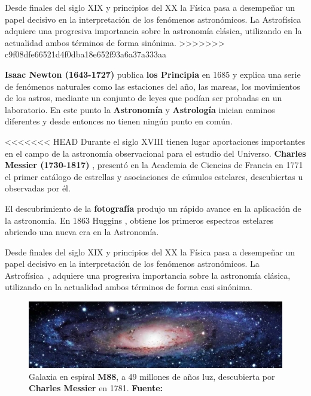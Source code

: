 \bigskip
Desde finales del siglo XIX y principios del XX la Física pasa a desempeñar un papel decisivo en la interpretación de los fenómenos astronómicos. La Astrofísica\cite{astrofisica} adquiere una progresiva importancia sobre la astronomía clásica, utilizando en la actualidad ambos términos de forma sinónima.
>>>>>>> c9f08dfe66521d4f0dba18e652f93a6a37a333aa

\textbf{Isaac Newton (1643-1727)} \cite{Newton} publica \textbf{los Principia} en 1685 \cite{los_principia} y explica una serie de fenómenos naturales como las estaciones del año, las mareas, los movimientos de los astros, mediante un conjunto de leyes que podían ser probadas en un laboratorio. En este punto la \textbf{Astronomía} \cite{astronomia} y \textbf{Astrología} \cite{astrologia} inician caminos diferentes y desde entonces no tienen ningún punto en común.


<<<<<<< HEAD
Durante el siglo XVIII tienen lugar aportaciones importantes en el campo de la astronomía observacional para el estudio del Universo. \textbf{Charles Messier (1730-1817)} \cite{messier}, presentó en la Academia de Ciencias de Francia en 1771 el primer catálogo de estrellas y asociaciones de cúmulos estelares, descubiertas u observadas por él.


El descubrimiento de la \textbf{fotografía} produjo un rápido avance en la aplicación de la astronomía. En 1863 Huggins \cite{huggins}, obtiene los primeros espectros estelares ~\cite{analisispectal} abriendo una nueva era en la Astronomía.


Desde finales del siglo XIX y principios del XX la Física pasa a desempeñar un papel decisivo en la interpretación de los fenómenos astronómicos. La Astrofísica~\cite{astrofisica}, adquiere una progresiva importancia sobre la astronomía clásica, utilizando en la actualidad ambos términos de forma casi sinónima.


\begin{figure}[b]
	\centering
	\includegraphics[width=1\linewidth]{../images/astrofooter}
	\caption[Galaxia M88]{Galaxia en espiral \textbf{M88}, a 49 millones de años luz, descubierta por \textbf{Charles Messier} en 1781. \textbf{Fuente:} \cite{M88}}
	\label{fig:astrofooter}
\end{figure}


